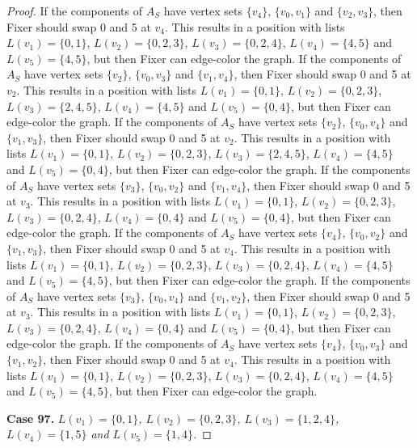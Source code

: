 \documentclass[12pt]{amsart}
\theoremstyle{plain}
\theoremstyle{definition}
\theoremstyle{remark}
\begin{document}
\begin{proof}
If the components of $A_S$ have vertex sets $\{v_4\}$, $\{v_0, v_1\}$ and $\{v_2, v_3\}$, then Fixer should swap 0 and 5 at $v_4$. This results in a position with lists $L(v_1) = \{0, 1\}$, $L(v_2) = \{0, 2, 3\}$, $L(v_3) = \{0, 2, 4\}$, $L(v_4) = \{4, 5\}$ and $L(v_5) = \{4, 5\}$, but then Fixer can edge-color the graph.
If the components of $A_S$ have vertex sets $\{v_2\}$, $\{v_0, v_3\}$ and $\{v_1, v_4\}$, then Fixer should swap 0 and 5 at $v_2$. This results in a position with lists $L(v_1) = \{0, 1\}$, $L(v_2) = \{0, 2, 3\}$, $L(v_3) = \{2, 4, 5\}$, $L(v_4) = \{4, 5\}$ and $L(v_5) = \{0, 4\}$, but then Fixer can edge-color the graph.
If the components of $A_S$ have vertex sets $\{v_2\}$, $\{v_0, v_4\}$ and $\{v_1, v_3\}$, then Fixer should swap 0 and 5 at $v_2$. This results in a position with lists $L(v_1) = \{0, 1\}$, $L(v_2) = \{0, 2, 3\}$, $L(v_3) = \{2, 4, 5\}$, $L(v_4) = \{4, 5\}$ and $L(v_5) = \{0, 4\}$, but then Fixer can edge-color the graph.
If the components of $A_S$ have vertex sets $\{v_3\}$, $\{v_0, v_2\}$ and $\{v_1, v_4\}$, then Fixer should swap 0 and 5 at $v_3$. This results in a position with lists $L(v_1) = \{0, 1\}$, $L(v_2) = \{0, 2, 3\}$, $L(v_3) = \{0, 2, 4\}$, $L(v_4) = \{0, 4\}$ and $L(v_5) = \{0, 4\}$, but then Fixer can edge-color the graph.
If the components of $A_S$ have vertex sets $\{v_4\}$, $\{v_0, v_2\}$ and $\{v_1, v_3\}$, then Fixer should swap 0 and 5 at $v_4$. This results in a position with lists $L(v_1) = \{0, 1\}$, $L(v_2) = \{0, 2, 3\}$, $L(v_3) = \{0, 2, 4\}$, $L(v_4) = \{4, 5\}$ and $L(v_5) = \{4, 5\}$, but then Fixer can edge-color the graph.
If the components of $A_S$ have vertex sets $\{v_3\}$, $\{v_0, v_4\}$ and $\{v_1, v_2\}$, then Fixer should swap 0 and 5 at $v_3$. This results in a position with lists $L(v_1) = \{0, 1\}$, $L(v_2) = \{0, 2, 3\}$, $L(v_3) = \{0, 2, 4\}$, $L(v_4) = \{0, 4\}$ and $L(v_5) = \{0, 4\}$, but then Fixer can edge-color the graph.
If the components of $A_S$ have vertex sets $\{v_4\}$, $\{v_0, v_3\}$ and $\{v_1, v_2\}$, then Fixer should swap 0 and 5 at $v_4$. This results in a position with lists $L(v_1) = \{0, 1\}$, $L(v_2) = \{0, 2, 3\}$, $L(v_3) = \{0, 2, 4\}$, $L(v_4) = \{4, 5\}$ and $L(v_5) = \{4, 5\}$, but then Fixer can edge-color the graph.

\noindent\textbf{Case 97.  }\textit{$L(v_1) = \{0, 1\}$, $L(v_2) = \{0, 2, 3\}$, $L(v_3) = \{1, 2, 4\}$, $L(v_4) = \{1, 5\}$ and $L(v_5) = \{1, 4\}$.}


\end{proof}
\end{document}
